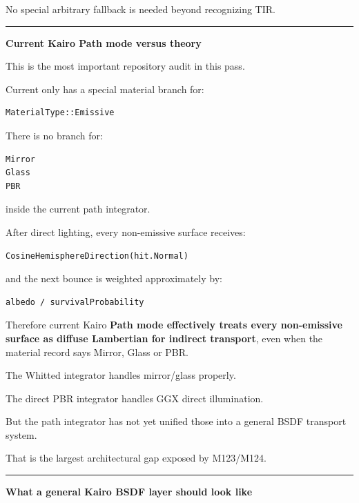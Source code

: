 No special arbitrary fallback is needed beyond recognizing TIR.

\begin{center}\rule{0.5\linewidth}{0.5pt}\end{center}

\textbf{Current Kairo Path mode versus theory}

This is the most important repository audit in this pass.

Current  only has a special material branch for:

\begin{verbatim}
MaterialType::Emissive
\end{verbatim}

There is no branch for:

\begin{verbatim}
Mirror
Glass
PBR
\end{verbatim}

inside the current path integrator.

After direct lighting, every non-emissive surface receives:

\begin{verbatim}
CosineHemisphereDirection(hit.Normal)
\end{verbatim}

and the next bounce is weighted approximately by:

\begin{verbatim}
albedo / survivalProbability
\end{verbatim}

Therefore current Kairo \textbf{Path mode effectively treats every non-emissive surface as diffuse Lambertian for indirect transport}, even when the material record says Mirror, Glass or PBR.

The Whitted integrator handles mirror/glass properly.

The direct PBR integrator handles GGX direct illumination.

But the path integrator has not yet unified those into a general BSDF transport system.

That is the largest architectural gap exposed by M123/M124.

\begin{center}\rule{0.5\linewidth}{0.5pt}\end{center}

\textbf{What a general Kairo BSDF layer should look like}

